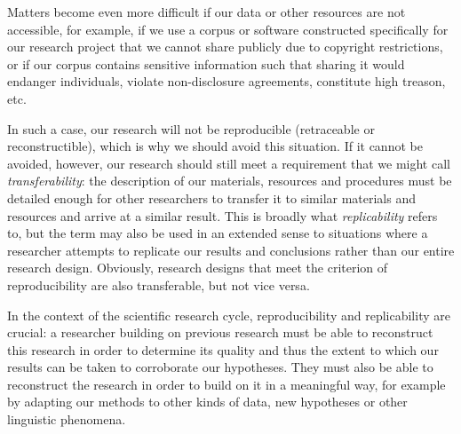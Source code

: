 Matters become even more difficult if our data or other resources are not accessible, for example, if we use a corpus or software constructed specifically for our research project that we cannot share publicly due to copyright restrictions, or if our corpus contains sensitive information such that sharing it would endanger individuals, violate non\hyp{}disclosure agreements, constitute high treason, etc.

In such a case, our research will not be reproducible  (retraceable  or reconstructible),  which is why we should avoid this situation. If it cannot be avoided, however, our research should still meet a requirement that we might call \textit{transferability}: the description of our materials, resources and procedures must be detailed enough for other researchers to transfer it to similar materials and resources and arrive at a similar result. This is broadly what \textit{replicability}  refers to, but the term may also be used in an extended sense to situations where a researcher attempts to replicate our results and conclusions rather than our entire research design.  Obviously, research designs that meet the criterion of reproducibility  are also transferable, but not vice versa.

In the context of the scientific research cycle, reproducibility  and replicability  are crucial: a researcher building on previous research must be able to reconstruct this research in order to determine its quality and thus the extent to which our results can be taken to corroborate our hypotheses. They must also be able to reconstruct the research in order to build on it in a meaningful way, for example by adapting our methods to other kinds of data, new hypotheses or other linguistic phenomena.\largerpage

